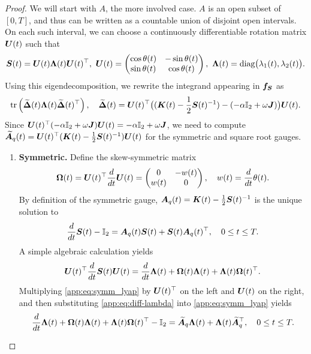 \begin{proof}
We will start with $A$, the more involved case. 
$A$ is an open subset of $[0, T]$, and thus can be written as a countable union of disjoint open intervals. 
On each such interval, we can choose a continuously differentiable rotation matrix $\boldsymbol{U}(t)$ such that
\begin{equation*}
    \mbS(t)=\mbU(t)\mbLambda(t)\mbU(t)^\top, \ \mbU(t) = \begin{pmatrix} \cos \theta(t) & -\sin \theta(t)\\ \sin \theta(t) & \cos \theta(t) \end{pmatrix}, \ \mbLambda(t)=\diag\big(\lambda_1(t),\lambda_2(t)\big).
\end{equation*}
Using this eigendecomposition, we rewrite the integrand appearing in $\boldsymbol{f}_{\boldsymbol{S}}$ as 
\begin{equation*}
    \mathrm{tr}\left(\widetilde{\boldsymbol{\Delta}}(t)\boldsymbol{\Lambda}(t)\widetilde{\boldsymbol{\Delta}}(t)^\top \right), \quad  \widetilde{\boldsymbol{\Delta}}(t) = \boldsymbol{U}(t)^\top \big((\boldsymbol{K}(t) - \frac{1}{2} \boldsymbol{S}(t)^{-1} )-(-\alpha \mathbb{I}_2 + \omega \boldsymbol{J})\big)\boldsymbol{U}(t).
\end{equation*}
Since $\boldsymbol{U}(t)^\top (-\alpha \mathbb{I}_2 + \omega \boldsymbol{J}) \boldsymbol{U}(t) = -\alpha \mathbb{I}_2 + \omega \boldsymbol{J}$, we need to compute $\widetilde{\boldsymbol{A}}_q(t) = \boldsymbol{U}(t)^\top(\boldsymbol{K}(t) - \frac{1}{2} \boldsymbol{S}(t)^{-1})\boldsymbol{U}(t)$ for the symmetric and square root gauges. 
\begin{enumerate}[label=(\alph*)]
    \item \textbf{Symmetric.}
    Define the skew-symmetric matrix
    \begin{equation*}
    \boldsymbol{\Omega}(t) = \boldsymbol{U}(t)^\top \frac{d}{dt}\boldsymbol{U}(t) = \begin{pmatrix} 0 & -w(t) \\ w(t) & 0 \end{pmatrix}, \quad w(t) = \frac{d}{dt}\theta(t).
    \end{equation*}
    By definition of the symmetric gauge, $\boldsymbol{A}_q(t) = \boldsymbol{K}(t) - \frac{1}{2} \boldsymbol{S}(t)^{-1}$ is the unique solution to
    \begin{equation}\label{app:eq:symm_lyap}
        \frac{d}{dt} \boldsymbol{S}(t) - \mathbb{I}_2  = \boldsymbol{A}_q(t)\boldsymbol{S}(t) + \boldsymbol{S}(t) \boldsymbol{A}_q(t)^\top, \quad 0 \leq t \leq T.
    \end{equation}
    A simple algebraic calculation yields
    \begin{equation}\label{app:eq:diff-lambda}
        \boldsymbol{U}(t)^\top  \frac{d}{dt} \boldsymbol{S}(t) \boldsymbol{U}(t) = \frac{d}{dt} \boldsymbol{\Lambda}(t) + \boldsymbol{\Omega}(t) \boldsymbol{\Lambda}(t) + \boldsymbol{\Lambda}(t) \boldsymbol{\Omega}(t)^\top.
    \end{equation}
    Multiplying \cref{app:eq:symm_lyap} by $\boldsymbol{U}(t)^\top$ on the left and $\boldsymbol{U}(t)$ on the right, and then substituting \cref{app:eq:diff-lambda} into \cref{app:eq:symm_lyap} yields
    \begin{equation*}
        \frac{d}{dt} \boldsymbol{\Lambda}(t) + \boldsymbol{\Omega}(t) \boldsymbol{\Lambda}(t) + \boldsymbol{\Lambda}(t) \boldsymbol{\Omega}(t)^\top - \mathbb{I}_2 = \widetilde{\boldsymbol{A}}_q \boldsymbol{\Lambda}(t) + \boldsymbol{\Lambda}(t) \widetilde{\boldsymbol{A}}_q^\top, \quad 0 \leq t \leq T.
    \end{equation*}


\end{enumerate}
\end{proof}
